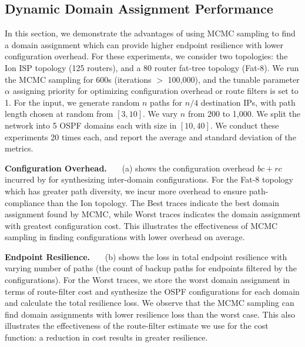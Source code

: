 \begin{figure*}[!t]
	\centering
\end{figure*}

\subsection{Dynamic Domain Assignment Performance} \label{sec:mcmceval}
In this section, we demonstrate the advantages of using MCMC sampling
to find a domain assignment which can provide higher endpoint
resilience with lower configuration overhead. For these experiments,
we consider two topologies: the Ion ISP topology (125 routers), and a
80 router fat-tree topology (Fat-8). We run the MCMC sampling for 600s
(iterations $>$ 100,000), and the tunable parameter $\alpha$ assigning
priority for optimizing configuration overhead or route filters is set
to 1. For the input, we generate random $n$ paths for $n/4$
destination IPs, with path length chosen at random from $[3,10]$. 
We vary $n$ from 200 to 1,000.
We
split the network into 5 OSPF domains each with size in $[10,40]$. We
conduct these experiments 20 times each, and report the average and
standard deviation of the metrics.

\noindent\textbf{Configuration Overhead.}~~~
(a) shows the configuration overhead $bc + rc$ 
incurred by \name for synthesizing inter-domain configurations.
For the Fat-8 topology which has greater path diversity, we incur more 
overhead to ensure path-compliance than the Ion topology. 
The Best traces indicate the best domain assignment found by MCMC, while 
Worst traces indicates the domain assignment with greatest 
configuration cost. 
This illustrates
the effectiveness of MCMC sampling in finding configurations with lower overhead on average.

\noindent\textbf{Endpoint Resilience.}~~~ (b) shows
the loss in total endpoint resilience with varying number of paths
(the count of backup paths for endpoints filtered by the
configurations). For the Worst traces, we store the worst domain
assignment in terms of route-filter cost and synthesize the OSPF
configurations for each domain and calculate the total resilience
loss. We observe that the MCMC sampling can find domain assignments
with lower resilience loss than the worst case. This also illustrates
the effectiveness of the route-filter estimate we use for the cost
function: a reduction in cost results in greater resilience.

